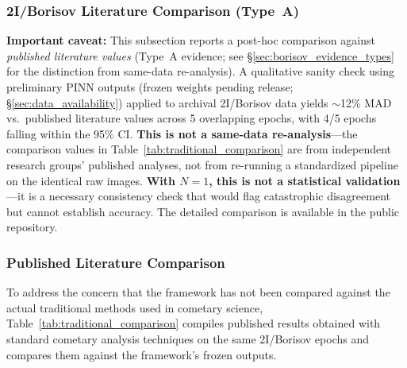 \documentclass[usenatbib]{mnras}
\begin{document}
\subsubsection{2I/Borisov Literature Comparison (Type~A)}\label{sec:borisov_check}

\textbf{Important caveat:} This subsection reports a post-hoc comparison against \textit{published literature values} (Type~A evidence; see \S\ref{sec:borisov_evidence_types} for the distinction from same-data re-analysis). A qualitative sanity check using preliminary PINN outputs (frozen weights pending release; \S\ref{sec:data_availability}) applied to archival 2I/Borisov data yields $\sim$12\% MAD vs.\ published literature values across 5 overlapping epochs, with 4/5 epochs falling within the 95\% CI. \textbf{This is not a same-data re-analysis}---the comparison values in Table~\ref{tab:traditional_comparison} are from independent research groups' published analyses, not from re-running a standardized pipeline on the identical raw images. \textbf{With $N=1$, this is not a statistical validation}---it is a necessary consistency check that would flag catastrophic disagreement but cannot establish accuracy. The detailed comparison is available in the public repository.

\subsubsection{Published Literature Comparison}\label{sec:traditional_comparison}

To address the concern that the framework has not been compared against the actual traditional methods used in cometary science, Table~\ref{tab:traditional_comparison} compiles published results obtained with standard cometary analysis techniques on the same 2I/Borisov epochs and compares them against the framework's frozen outputs.
\end{document}
